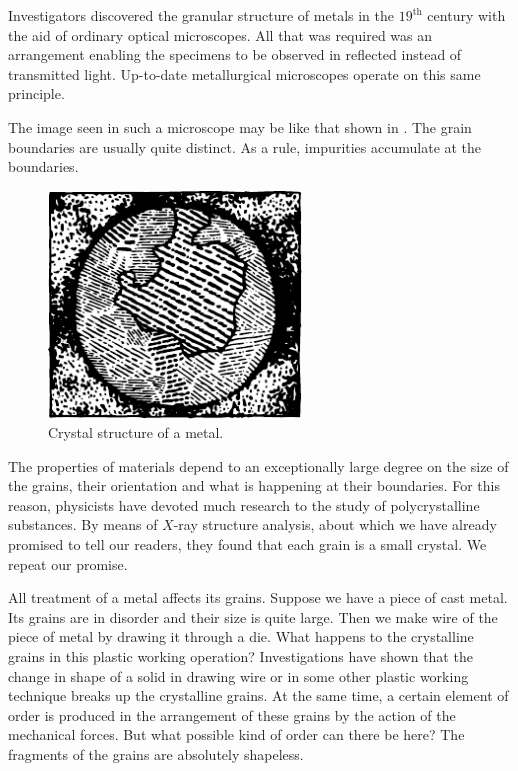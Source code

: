 Investigators discovered the granular structure of met­als in the $19^{\textrm{th}}$ century with the aid of ordinary optical microscopes. All that was required was an arrangement enabling the specimens to be observed in reflected instead of transmitted light. Up-to-date metallurgical microscopes operate on this same principle.

The image seen in such a microscope may be like that shown in . The grain boundaries are usually quite distinct. As a rule, impurities accumulate at the boundaries.

\begin{figure}[!ht]
\centering
\includegraphics[width=0.6\textwidth]{figures/fig-02-22.pdf}
\caption{Crystal structure of a metal.}
\label{fig-2.22}
\end{figure}

The properties of materials depend to an exceptionally large degree on the size of the grains, their orientation and what is happening at their boundaries. For this reason, physicists have devoted much research to the study of polycrystalline substances. By means of $X$-ray structure analysis, about which we have already promised to tell our readers, they found that each grain is a small crystal. We repeat our promise.

All treatment of a metal affects its grains. Suppose we have a piece of cast metal. Its grains are in disorder and their size is quite large. Then we make wire of the piece of metal by drawing it through a die. What happens to the crystalline grains in this plastic working operation? Investigations have shown that the change in shape of a solid in drawing wire or in some other plastic working technique breaks up the crystalline grains. At the same time, a certain element of order is produced in the arrange­ment of these grains by the action of the mechanical forces. But what possible kind of order can there be here? The fragments of the grains are absolutely shapeless.

